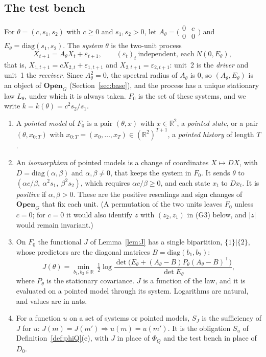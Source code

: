 \subsection{The test bench}
\begin{definition}\label{def:gauss-F0}
For $\theta=(c,s_1,s_2)$ with $c\ge0$ and $s_1,s_2>0$, let $A_\theta=\bigl(\begin{smallmatrix}0&c\\0&0\end{smallmatrix}\bigr)$ and $E_\theta=\mathrm{diag}(s_1,s_2)$. The \emph{system} $\theta$ is the two-unit process
\[
X_{t+1}=A_\theta X_t+\varepsilon_{t+1},\qquad (\varepsilon_t)_t\ \text{independent, each}\ N(0,E_\theta),
\]
that is, $X_{1,t+1}=cX_{2,t}+\varepsilon_{1,t+1}$ and $X_{2,t+1}=\varepsilon_{2,t+1}$: unit~2 is the \emph{driver} and unit~1 the \emph{receiver}. Since $A_\theta^2=0$, the spectral radius of $A_\theta$ is $0$, so $(A_\theta,E_\theta)$ is an object of $\mathbf{Open}_G$ (Section~\ref{sec:base}), and the process has a unique stationary law $L_\theta$, under which it is always taken. $F_0$ is the set of these systems, and we write $k=k(\theta)=c^2s_2/s_1$.
\begin{enumerate}
\item[(a)] A \emph{pointed model} of $F_0$ is a pair $(\theta,x)$ with $x\in\mathbb R^2$, a \emph{pointed state}, or a pair $(\theta,x_{0:T})$ with $x_{0:T}=(x_0,\dots,x_T)\in(\mathbb R^2)^{T+1}$, a \emph{pointed history} of length $T$.
\item[(b)] An \emph{isomorphism} of pointed models is a change of coordinates $X\mapsto DX$, with $D=\mathrm{diag}(\alpha,\beta)$ and $\alpha,\beta\ne0$, that keeps the system in $F_0$. It sends $\theta$ to $(\alpha c/\beta,\ \alpha^2s_1,\ \beta^2s_2)$, which requires $\alpha c/\beta\ge0$, and each state $x_t$ to $Dx_t$. It is \emph{positive} if $\alpha,\beta>0$. These are the positive rescalings and sign changes of $\mathbf{Open}_G$ that fix each unit. (A permutation of the two units leaves $F_0$ unless $c=0$; for $c=0$ it would also identify $z$ with $(z_2,z_1)$ in (G3) below, and $|z|$ would remain invariant.)
\item[(c)] On $F_0$ the functional $J$ of Lemma~\ref{lem:J} has a single bipartition, $\{1\}|\{2\}$, whose predictors are the diagonal matrices $B=\mathrm{diag}(b_1,b_2)$:
\[
J(\theta)=\min_{b_1,b_2\in\mathbb R}\ \tfrac12\log\frac{\det\bigl(E_\theta+(A_\theta-B)P_\theta(A_\theta-B)^\top\bigr)}{\det E_\theta},
\]
where $P_\theta$ is the stationary covariance. $J$ is a function of the law, and it is evaluated on a pointed model through its system. Logarithms are natural, and values are in nats.
\item[(d)] For a function $u$ on a set of systems or pointed models, $S_J$ is the sufficiency of $J$ for $u$: $J(m)=J(m')\Rightarrow u(m)=u(m')$. It is the obligation $S_u$ of Definition~\ref{def:phiQ}(e), with $J$ in place of $\Phi_Q$ and the test bench in place of $D_0$.
\end{enumerate}
\end{definition}

